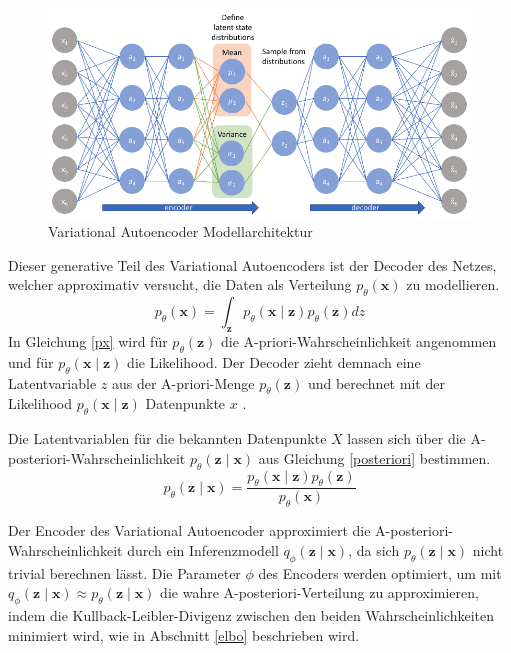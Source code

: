\begin{figure}[h]
    \centering
    \includegraphics[width=13.2cm]{bilder/vae}
    \caption{Variational Autoencoder Modellarchitektur \citep{jordan_2018}}
    \label{vae_model}
\end{figure}



Dieser generative Teil des Variational Autoencoders ist der Decoder des  Netzes, welcher approximativ versucht, die Daten als Verteilung $p_\theta (\mathbf{x})$ zu modellieren.
\begin{equation}
    \label{px}
p_\theta (\mathbf{x}) = \int_{\mathbf{z}} p_\theta (\mathbf{x\mid z}) p_\theta (\mathbf{z}) dz
\end{equation}
In Gleichung \ref{px} wird für $p_\theta (\mathbf{z})$ die A-priori-Wahrscheinlichkeit angenommen und für $p_\theta (\mathbf{x\mid z})$ die Likelihood. Der Decoder zieht demnach eine Latentvariable $z$ aus der A-priori-Menge $p_\theta (\mathbf{z})$ und berechnet mit der Likelihood $p_\theta (\mathbf{x\mid z})$ Datenpunkte $x$ \citep{vae2}.

Die Latentvariablen für die bekannten Datenpunkte $X$ lassen sich über die A-posteriori-Wahrscheinlichkeit $p_\theta (\mathbf{z\mid x})$ aus Gleichung \ref{posteriori} bestimmen. 
\begin{equation}
    \label{posteriori}
    p_\theta (\mathbf{z\mid x}) = \frac{p_\theta (\mathbf{x\mid z}) p_\theta (\mathbf{z})}{p_\theta(\mathbf{x})}
\end{equation}

Der Encoder des Variational Autoencoder approximiert die A-posteriori-Wahrscheinlichkeit durch ein Inferenzmodell $q_\phi (\mathbf{z\mid x})$, da sich $p_\theta (\mathbf{z\mid x})$ nicht trivial berechnen lässt.
Die Parameter $\phi$ des Encoders werden optimiert, um mit $q_\phi (\mathbf{z\mid x}) \approx p_\theta (\mathbf{z\mid x})$ die wahre A-posteriori-Verteilung zu approximieren, indem die Kullback-Leibler-Divigenz zwischen den beiden Wahrscheinlichkeiten minimiert wird, wie in Abschnitt \ref{elbo} beschrieben wird.



